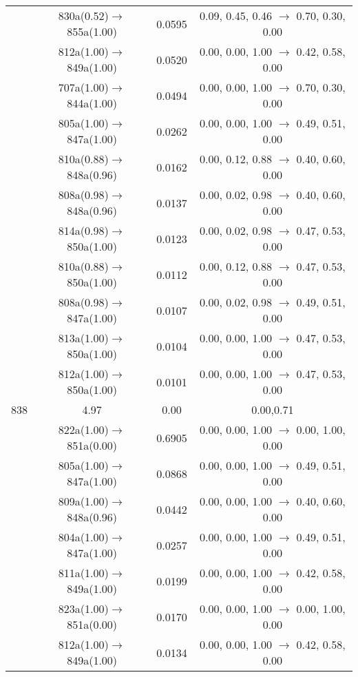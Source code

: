\documentclass[10pt,a4paper]{article}
\begin{document}
\begin{longtable}{c|c|c|c}
 	& 830a(0.52)$\rightarrow$855a(1.00) &	 0.0595 &	 0.09, 0.45, 0.46 $\rightarrow$ 0.70, 0.30, 0.00 \\ 
 	& 812a(1.00)$\rightarrow$849a(1.00) &	 0.0520 &	 0.00, 0.00, 1.00 $\rightarrow$ 0.42, 0.58, 0.00 \\ 
 	& 707a(1.00)$\rightarrow$844a(1.00) &	 0.0494 &	 0.00, 0.00, 1.00 $\rightarrow$ 0.70, 0.30, 0.00 \\ 
 	& 805a(1.00)$\rightarrow$847a(1.00) &	 0.0262 &	 0.00, 0.00, 1.00 $\rightarrow$ 0.49, 0.51, 0.00 \\ 
 	& 810a(0.88)$\rightarrow$848a(0.96) &	 0.0162 &	 0.00, 0.12, 0.88 $\rightarrow$ 0.40, 0.60, 0.00 \\ 
 	& 808a(0.98)$\rightarrow$848a(0.96) &	 0.0137 &	 0.00, 0.02, 0.98 $\rightarrow$ 0.40, 0.60, 0.00 \\ 
 	& 814a(0.98)$\rightarrow$850a(1.00) &	 0.0123 &	 0.00, 0.02, 0.98 $\rightarrow$ 0.47, 0.53, 0.00 \\ 
 	& 810a(0.88)$\rightarrow$850a(1.00) &	 0.0112 &	 0.00, 0.12, 0.88 $\rightarrow$ 0.47, 0.53, 0.00 \\ 
 	& 808a(0.98)$\rightarrow$847a(1.00) &	 0.0107 &	 0.00, 0.02, 0.98 $\rightarrow$ 0.49, 0.51, 0.00 \\ 
 	& 813a(1.00)$\rightarrow$850a(1.00) &	 0.0104 &	 0.00, 0.00, 1.00 $\rightarrow$ 0.47, 0.53, 0.00 \\ 
 	& 812a(1.00)$\rightarrow$850a(1.00) &	 0.0101 &	 0.00, 0.00, 1.00 $\rightarrow$ 0.47, 0.53, 0.00 \\ 
 \hline838 &	 4.97 &	 0.00 &	 0.00,0.71 \\ 
  	& 822a(1.00)$\rightarrow$851a(0.00) &	 0.6905 &	 0.00, 0.00, 1.00 $\rightarrow$ 0.00, 1.00, 0.00 \\ 
 	& 805a(1.00)$\rightarrow$847a(1.00) &	 0.0868 &	 0.00, 0.00, 1.00 $\rightarrow$ 0.49, 0.51, 0.00 \\ 
 	& 809a(1.00)$\rightarrow$848a(0.96) &	 0.0442 &	 0.00, 0.00, 1.00 $\rightarrow$ 0.40, 0.60, 0.00 \\ 
 	& 804a(1.00)$\rightarrow$847a(1.00) &	 0.0257 &	 0.00, 0.00, 1.00 $\rightarrow$ 0.49, 0.51, 0.00 \\ 
 	& 811a(1.00)$\rightarrow$849a(1.00) &	 0.0199 &	 0.00, 0.00, 1.00 $\rightarrow$ 0.42, 0.58, 0.00 \\ 
 	& 823a(1.00)$\rightarrow$851a(0.00) &	 0.0170 &	 0.00, 0.00, 1.00 $\rightarrow$ 0.00, 1.00, 0.00 \\ 
 	& 812a(1.00)$\rightarrow$849a(1.00) &	 0.0134 &	 0.00, 0.00, 1.00 $\rightarrow$ 0.42, 0.58, 0.00 \\ 

\end{longtable}
\end{document}
